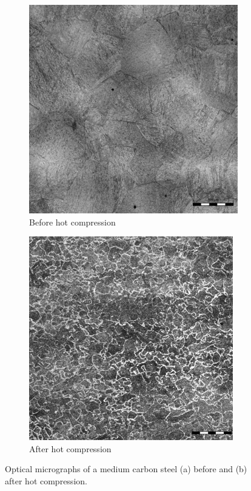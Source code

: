 \documentclass[twoside,english,1p,final,sort&compress]{elsarticle}
\theoremstyle{plain}
\begin{document}
\begin{figure}[!ht]
\centering
\begin{subfigure}[b]{0.45\columnwidth}
\centering
\includegraphics[width=\columnwidth]{Figures/BeforeCompM}
\caption{Before hot compression}
\end{subfigure}
\hfill
\begin{subfigure}[b]{0.45\columnwidth}
\centering
\includegraphics[width=\columnwidth]{Figures/AfterCompM}
\caption{After hot compression}
\end{subfigure}
\caption{Optical micrographs of a medium carbon steel (a) before  and (b) after hot compression.}
\label{fig:Micrography}
\end{figure}
\end{document}
